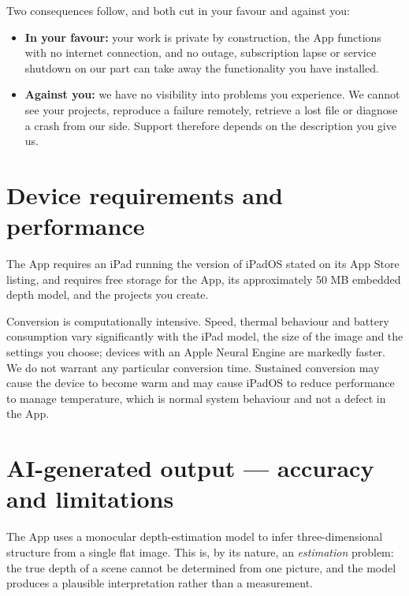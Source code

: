 \documentclass[11pt]{article}
\begin{document}
Two consequences follow, and both cut in your favour and against you:

\begin{itemize}
  \item \textbf{In your favour:} your work is private by construction, the App
        functions with no internet connection, and no outage, subscription lapse or
        service shutdown on our part can take away the functionality you have
        installed.
  \item \textbf{Against you:} we have no visibility into problems you experience. We
        cannot see your projects, reproduce a failure remotely, retrieve a lost file or
        diagnose a crash from our side. Support therefore depends on the description
        you give us.
\end{itemize}

\section{Device requirements and performance}

The App requires an iPad running the version of iPadOS stated on its App Store listing,
and requires free storage for the App, its approximately 50 MB embedded depth model,
and the projects you create.

Conversion is computationally intensive. Speed, thermal behaviour and battery
consumption vary significantly with the iPad model, the size of the image and the
settings you choose; devices with an Apple Neural Engine are markedly faster. We do not
warrant any particular conversion time. Sustained conversion may cause the device to
become warm and may cause iPadOS to reduce performance to manage temperature, which is
normal system behaviour and not a defect in the App.

\section{AI-generated output — accuracy and limitations}

The App uses a monocular depth-estimation model to infer three-dimensional structure
from a single flat image. This is, by its nature, an \emph{estimation} problem: the true
depth of a scene cannot be determined from one picture, and the model produces a
plausible interpretation rather than a measurement.
\end{document}
